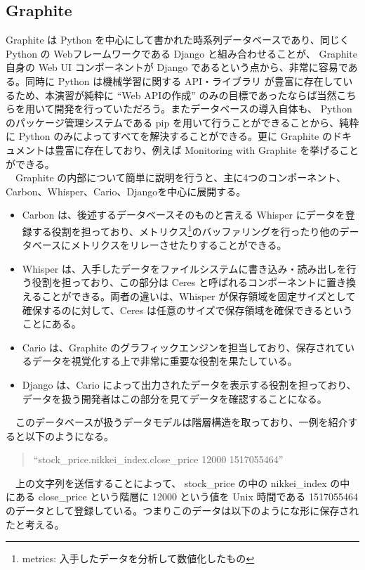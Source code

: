\documentclass{scrartcl}
\begin{document}
\subsection{Graphite}
\label{sec:org32ca277}
Graphite は Python を中心にして書かれた時系列データベースであり、同じく Python の Webフレームワークである Django と組み合わせることが、 Graphite 自身の Web UI コンポーネントが Django であるという点から、非常に容易である。同時に Python は機械学習に関する API・ライブラリ が豊富に存在しているため、本演習が純粋に ``Web APIの作成'' のみの目標であったならば当然こちらを用いて開発を行っていただろう。またデータベースの導入自体も、 Python のパッケージ管理システムである pip を用いて行うことができることから、純粋に Python のみによってすべてを解決することができる。更に Graphite のドキュメントは豊富に存在しており、例えば Monitoring with Graphite \cite{graphite-oreilly} を挙げることができる。\\
　Graphite の内部について簡単に説明を行うと、主に4つのコンポーネント、Carbon、Whisper、Cario、Djangoを中心に展開する。\\
\begin{itemize}
\item Carbon は、後述するデータベースそのものと言える Whisper にデータを登録する役割を担っており、メトリクス\footnote[1]{metrics: 入手したデータを分析して数値化したもの}のバッファリングを行ったり他のデータベースにメトリクスをリレーさせたりすることができる。\\
\item Whisper は、入手したデータをファイルシステムに書き込み・読み出しを行う役割を担っており、この部分は Ceres と呼ばれるコンポーネントに置き換えることができる。両者の違いは、Whisper が保存領域を固定サイズとして確保するのに対して、Ceres は任意のサイズで保存領域を確保できるということにある。\\
\item Cario は、Graphite のグラフィックエンジンを担当しており、保存されているデータを視覚化する上で非常に重要な役割を果たしている。\\
\item Django は、Cario によって出力されたデータを表示する役割を担っており、データを扱う開発者はこの部分を見てデータを確認することになる。\\
\end{itemize}

　このデータベースが扱うデータモデルは階層構造を取っており、一例を紹介すると以下のようになる。\\
\begin{verse}
``stock\_price.nikkei\_index.close\_price 12000 1517055464''\\
\end{verse}
　上の文字列を送信することによって、 stock\_price の中の nikkei\_index の中にある close\_price という階層に 12000 という値を Unix 時間である 1517055464 のデータとして登録している。つまりこのデータは以下のようにな形に保存されたと考える。\\
\end{document}
